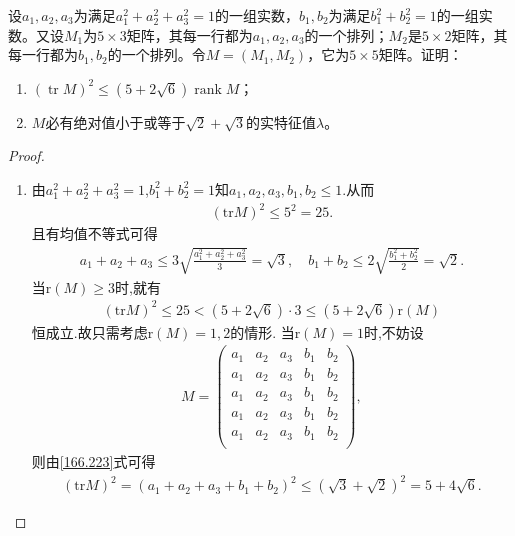\documentclass[../../main.tex]{subfiles}%
\begin{document}
\begin{example}
设$a_1,a_2,a_3$为满足$a_1^2 + a_2^2 + a_3^2 = 1$的一组实数，$b_1,b_2$为满足$b_1^2 + b_2^2 = 1$的一组实数。又设$M_1$为$5 \times 3$矩阵，其每一行都为$a_1,a_2,a_3$的一个排列；$M_2$是$5 \times 2$矩阵，其每一行都为$b_1,b_2$的一个排列。令$M = (M_1,M_2)$，它为$5 \times 5$矩阵。证明：
\begin{enumerate}[(1)]
\item $(\operatorname{tr} M)^2 \leqslant (5 + 2\sqrt{6})\operatorname{rank} M$；

\item $M$必有绝对值小于或等于$\sqrt{2} + \sqrt{3}$的实特征值$\lambda$。
\end{enumerate}
\end{example}
\begin{proof}
\begin{enumerate}[(1)]
\item 由$a_{1}^{2}+a_{2}^{2}+a_{3}^{2}=1$,$b_{1}^{2}+b_{2}^{2}=1$知$a_1,a_2,a_3,b_1,b_2\leqslant 1$.从而
\begin{align*}
\left( \mathrm{tr}M \right) ^2\leqslant 5^2=25.
\end{align*}
且有均值不等式可得
\begin{align}
a_1+a_2+a_3\leqslant 3\sqrt{\frac{a_{1}^{2}+a_{2}^{2}+a_{3}^{2}}{3}}=\sqrt{3},\quad b_1+b_2\leqslant 2\sqrt{\frac{b_{1}^{2}+b_{2}^{2}}{2}}=\sqrt{2}.\label{166.223}
\end{align}
当$\mathrm{r}\left( M \right) \geqslant 3$时,就有
\begin{align*}
\left( \mathrm{tr}M \right) ^2\leqslant 25<\left( 5+2\sqrt{6} \right) \cdot 3\leqslant \left( 5+2\sqrt{6} \right) \mathrm{r}\left( M \right)
\end{align*}
恒成立.故只需考虑$\mathrm{r}\left( M \right) =1,2$的情形.
当$\mathrm{r}\left( M \right) =1$时,不妨设
\begin{align*}
M=\begin{pmatrix}
a_1&	a_2&	a_3&	b_1&	b_2\\
a_1&	a_2&	a_3&	b_1&	b_2\\
a_1&	a_2&	a_3&	b_1&	b_2\\
a_1&	a_2&	a_3&	b_1&	b_2\\
a_1&	a_2&	a_3&	b_1&	b_2\\
\end{pmatrix},
\end{align*}
则由\eqref{166.223}式可得
\begin{align*}
\left( \mathrm{tr}M \right) ^2=\left( a_1+a_2+a_3+b_1+b_2 \right) ^2\leqslant \left( \sqrt{3}+\sqrt{2} \right) ^2=5+4\sqrt{6}.

\end{align*}
\end{enumerate}
\end{proof}
\end{document}
